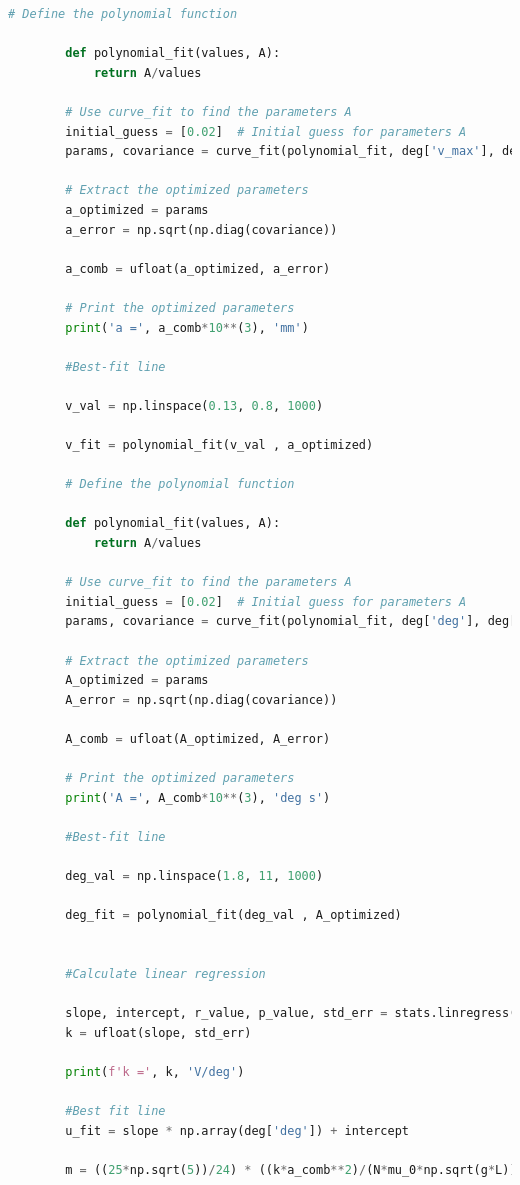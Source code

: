\documentclass[a4paper,11pt]{article}
\begin{document}
\begin{lstlisting}[language=Python, basicstyle=\tiny, breaklines=true, postbreak=\mbox{\textbackslashspace}]
        # Define the polynomial function

        def polynomial_fit(values, A):
            return A/values

        # Use curve_fit to find the parameters A
        initial_guess = [0.02]  # Initial guess for parameters A
        params, covariance = curve_fit(polynomial_fit, deg['v_max'], deg['dt'], p0=initial_guess)

        # Extract the optimized parameters
        a_optimized = params
        a_error = np.sqrt(np.diag(covariance))

        a_comb = ufloat(a_optimized, a_error)

        # Print the optimized parameters
        print('a =', a_comb*10**(3), 'mm')

        #Best-fit line

        v_val = np.linspace(0.13, 0.8, 1000)

        v_fit = polynomial_fit(v_val , a_optimized)

        # Define the polynomial function

        def polynomial_fit(values, A):
            return A/values

        # Use curve_fit to find the parameters A
        initial_guess = [0.02]  # Initial guess for parameters A
        params, covariance = curve_fit(polynomial_fit, deg['deg'], deg['dt'], p0=initial_guess)

        # Extract the optimized parameters
        A_optimized = params
        A_error = np.sqrt(np.diag(covariance))

        A_comb = ufloat(A_optimized, A_error)

        # Print the optimized parameters
        print('A =', A_comb*10**(3), 'deg s')

        #Best-fit line

        deg_val = np.linspace(1.8, 11, 1000)

        deg_fit = polynomial_fit(deg_val , A_optimized)


        #Calculate linear regression

        slope, intercept, r_value, p_value, std_err = stats.linregress(deg['deg'], deg['U_max'])
        k = ufloat(slope, std_err)

        print(f'k =', k, 'V/deg')

        #Best fit line 
        u_fit = slope * np.array(deg['deg']) + intercept

        m = ((25*np.sqrt(5))/24) * ((k*a_comb**2)/(N*mu_0*np.sqrt(g*L))) * ufloat(53.2,2.3)


\end{lstlisting}
\end{document}
